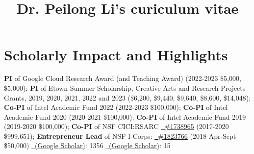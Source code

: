 \documentclass[11pt]{moderncv}
\title{Dr. Peilong Li's curiculum vitae}
\begin{document}
\maketitle

\section{Scholarly Impact and Highlights}
%
{\small 
\textbf{PI} of Google Cloud Research Award (and Teaching Award)
(2022-2023 \$5,000, \$5,000);\newline
\textbf{PI} of Etown Summer Scholarship, Creative Arts and Research Projects Grants, 2019, 2020, 2021, 2022 and 2023 (\$6,200, \$9,440, \$9,640, \$8,600, \$14,048); \newline
\textbf{Co-PI} of Intel Academic Fund 2022
   (2022-2023 \$100,000);\newline
\textbf{Co-PI} of Intel Academic Fund 2020
   (2020-2021 \$100,000);\newline
\textbf{Co-PI} of Intel Academic Fund 2019
   (2019-2020 \$100,000);\newline
\textbf{Co-PI} of NSF CICI:RSARC \href{https://nsf.gov/awardsearch/showAward?AWD_ID=1738965}
  {\color{color1}\homepagesymbol~\#1738965} (2017-2020 \$999,651);\newline
\textbf{Entrepreneur Lead} of NSF I-Corps: \href{https://nsf.gov/awardsearch/showAward?AWD_ID=1823766}
  {\color{color1}\homepagesymbol~\#1823766} (2018 Apr-Sept \$50,000)
}
%
%
%
{\small \href{https://scholar.google.com/citations?user=wFIBx94AAAAJ&hl}
  {\color{color2}\homepagesymbol~(Google Scholar)}: 1356}
%
%
{\small \href{https://scholar.google.com/citations?user=wFIBx94AAAAJ&hl}
  {\color{color2}\homepagesymbol~(Google Scholar)}: 15}
\end{document}
